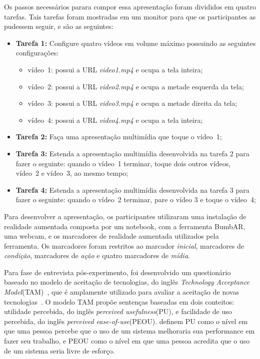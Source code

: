 \documentclass[../main.tex]{subfiles}
\begin{document}
Os passos necessários parara compor essa apresentação foram divididos em quatro tarefas. Tais tarefas foram mostradas em um monitor para que os participantes as pudessem seguir, e são as seguintes:

\begin{itemize}
    \item \textbf{Tarefa 1:} Configure quatro vídeos em volume máximo possuindo as seguintes configurações:
    \begin{itemize}
        \item vídeo~1: possui a URL \emph{video1.mp4} e ocupa a tela inteira;
        \item vídeo~2: possui a URL \emph{video2.mp4} e ocupa a metade esquerda da tela;
        \item vídeo~3: possui a URL \emph{video3.mp4} e ocupa a metade direita da tela;
        \item vídeo~4: possui a URL \emph{video4.mp4} e ocupa a tela inteira;
    \end{itemize}
    \item \textbf{Tarefa 2:} Faça uma apresentação multimídia que toque o vídeo~1;
    \item \textbf{Tarefa 3:} Estenda a apresentação multimídia desenvolvida na tarefa 2 para fazer o seguinte: quando o vídeo~1 terminar, toque dois outros vídeos, vídeo~2 e vídeo~3, ao mesmo tempo;
    \item \textbf{Tarefa 4:} Estenda a apresentação multimídia desenvolvida na tarefa 3 para fazer o seguinte: quando o vídeo~2 terminar, pare o vídeo 3 e toque o vídeo~4;
\end{itemize}

Para desenvolver a apresentação, os participantes utilizaram uma instalação de realidade aumentada composta por um notebook, com a ferramenta BumbAR, uma webcam, e os marcadores de realidade aumentada utilizados pela ferramenta. Os marcadores foram restritos ao marcador \emph{inicial}, marcadores de \emph{condição}, marcadores de \emph{ação} e quatro marcadores de \emph{mídia}.

Para fase de entrevista pós-experimento, foi desenvolvido um questionário baseado no modelo de aceitação de tecnologias, do inglês \emph{Technology Acceptance Model}(TAM)~\cite{davis1985technology,
davis1989user, venkatesh2000theoretical, davis_perceived_1989}, que é amplamente utilizado para avaliar a aceitação de novas tecnologias~\cite{wojciechowski2013evaluation, alraimi2015understanding,
pavlou2003consumer}. O modelo TAM propõe sentenças baseadas em dois conteitos: utilidade percebida, do inglês \emph{perceived usefulness}(PU), e facilidade de uso percebida, do inglês \emph{perceived ease-of-use}(PEOU).  definem PU como o nível em que uma pessoa percebe que o uso de um sistema melhoraria sua performance em fazer seu trabalho, e PEOU como o nível em que uma pessoa acredita que o uso de um sistema seria livre de esforço.
\end{document}

